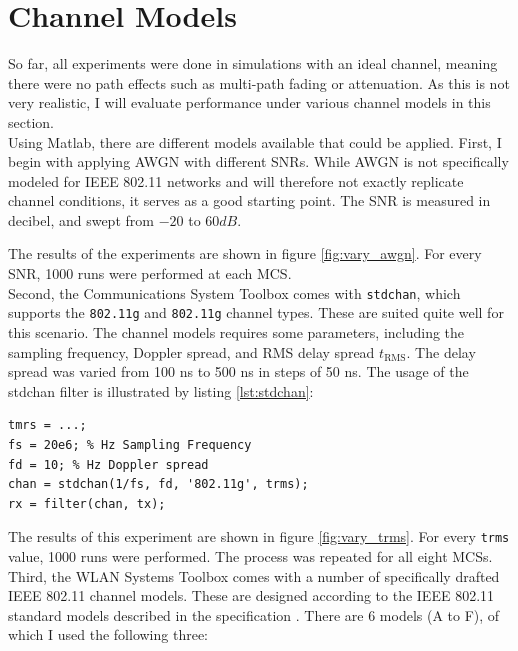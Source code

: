
\section{Channel Models}

So far, all experiments were done in simulations with an ideal channel, meaning there were no path effects such as multi-path fading or attenuation. As this is not very realistic, I will evaluate performance under various channel models in this section.\\

Using Matlab, there are different models available that could be applied. First, I begin with applying \gls{AWGN} with different \glspl{SNR}. While \gls{AWGN} is not specifically modeled for IEEE 802.11 networks and will therefore not exactly replicate channel conditions, it serves as a good starting point. The \gls{SNR} is measured in decibel, and swept from $ -20 $ to $ 60 dB $.

The results of the experiments are shown in figure \ref{fig:vary_awgn}. For every \gls{SNR}, 1000 runs were performed at each \gls{MCS}.\\

Second, the Communications System Toolbox comes with \texttt{stdchan}, which supports the \texttt{802.11g} and \texttt{802.11g} channel types. These are suited quite well for this scenario. The channel models requires some parameters, including the sampling frequency, Doppler spread, and \gls{RMS} delay spread $ t_{\text{RMS}} $. The delay spread was varied from 100 ns to 500 ns in steps of 50 ns. The usage of the stdchan filter is illustrated by listing \ref{lst:stdchan}:

\begin{lstlisting}[captionpos=b,caption={Matlab stdchan Channel Model},label=lst:stdchan]
tmrs = ...;
fs = 20e6; % Hz Sampling Frequency
fd = 10; % Hz Doppler spread
chan = stdchan(1/fs, fd, '802.11g', trms);
rx = filter(chan, tx);
\end{lstlisting}

The results of this experiment are shown in figure \ref{fig:vary_trms}. For every \texttt{trms} value, 1000 runs were performed. The process was repeated for all eight \glspl{MCS}.\\

Third, the WLAN Systems Toolbox comes with a number of specifically drafted IEEE 802.11 channel models. These are designed according to the IEEE 802.11 standard models described in the specification \cite{ieee2012}. There are 6 models (A to F), of which I used the following three:

